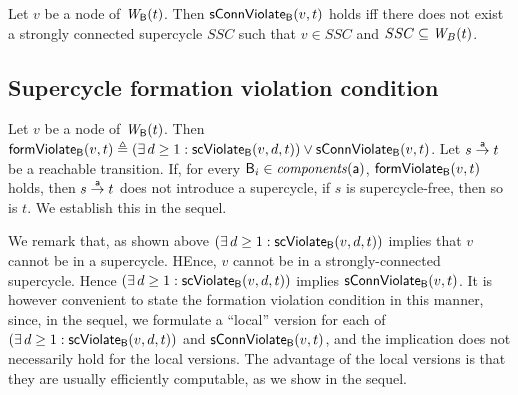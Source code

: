 \label{def:sConn.violation}
 Let $v$ be a node of $\wfg{\B}{t}$.   Then $\connViol{v}{t}$ holds iff there does not exist a strongly connected
 supercycle $SSC$ such that $v \in SSC$ and $SSC \sub \wfg{B}{t}$.
\ed




\subsection{Supercycle formation violation condition}

\label{def:formation.violation}
Let $v$ be a node of $\wfg{\B}{t}$.
Then $\formViol{v}{t}  \df (\exs d \ge 1: \scViol{v}{d}{t}) \lor \connViol{v}{t}$.
\ed
%
Let $s \goesto[\act] t$ be a reachable transition. If, for every $\B_i \in \cmps{\act}$, 
$\formViol{v}{t}$ holds, then $s \goesto[\act] t$ does not introduce a supercycle, \ie if $s$ is
supercycle-free, then so is $t$. We establish this in the sequel.

We remark that, as shown above $(\exs d \ge 1: \scViol{v}{d}{t})$
implies that $v$ cannot be in a supercycle. HEnce, $v$ cannot be in a strongly-connected supercycle. 
Hence $(\exs d \ge 1: \scViol{v}{d}{t})$ implies $\connViol{v}{t}$. It is however convenient to state the formation
violation condition in this manner, since, in the sequel, we formulate a ``local'' version for each of  
$(\exs d \ge 1: \scViol{v}{d}{t})$ and $\connViol{v}{t}$, and the implication does not necessarily hold for the local
versions. The advantage of the local versions is that they are usually efficiently computable, as we show in the sequel.